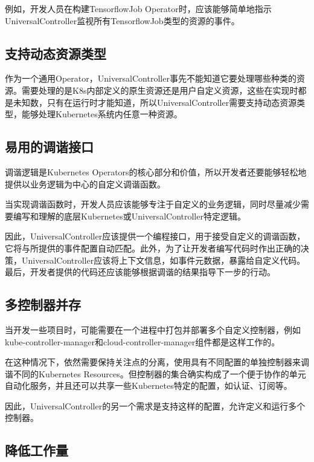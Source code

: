 \documentclass[macfonts,master]{njuthesis}
\begin{document}
例如，开发人员在构建TensorflowJob Operator时，应该能够简单地指示UniversalController监视所有TensorflowJob类型的资源的事件。

\subsection{支持动态资源类型}
作为一个通用Operator，UniversalController事先不能知道它要处理哪些种类的资源。需要处理的是K8s内部定义的原生资源还是用户自定义资源，这些在实现时都是未知数，只有在运行时才能知道，所以UniversalController需要支持动态资源类型，能够处理Kubernetes系统内任意一种资源。

\subsection{易用的调谐接口}
调谐逻辑是Kubernetes Operators的核心部分和价值，所以开发者还要能够轻松地提供以业务逻辑为中心的自定义调谐函数。

当实现调谐函数时，开发人员应该能够专注于自定义的业务逻辑，同时尽量减少需要编写和理解的底层Kubernetes或UniversalController特定逻辑。

因此，UniversalController应该提供一个编程接口，用于接受自定义的调谐函数，它将与所提供的事件配置自动匹配。此外，为了让开发者编写代码时作出正确的决策，UniversalController应该将上下文信息，如事件元数据，暴露给自定义代码。最后，开发者提供的代码还应该能够根据调谐的结果指导下一步的行动。

\subsection{多控制器并存}
当开发一些项目时，可能需要在一个进程中打包并部署多个自定义控制器，例如kube-controller-manager和cloud-controller-manager组件都是这样工作的。

在这种情况下，依然需要保持关注点的分离，使用具有不同配置的单独控制器来调谐不同的Kubernetes Resources。但控制器的集合确实构成了一个便于协作的单元自动化服务，并且还可以共享一些Kubernetes特定的配置，如认证、订阅等。

因此，UniversalController的另一个需求是支持这样的配置，允许定义和运行多个控制器。

\subsection{降低工作量}
\end{document}
